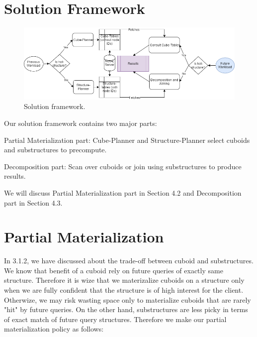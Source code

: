 




\section{Solution Framework}

\begin {figure}[H]
\centering
\includegraphics[scale=0.6]{pic/41.png}
\caption{Solution framework.}
\end{figure}

Our solution framework contains two major parts:

Partial Materialization part: Cube-Planner and Structure-Planner select cuboids and substructures to precompute.

Decomposition part: Scan over cuboids or join using substructures to produce results. 

We will discuss Partial Materialization part in Section 4.2 and Decomposition part in Section 4.3.

\section{Partial Materialization}


In 3.1.2, we have discussed about the trade-off between cuboid and substructures. We know that benefit of a cuboid rely on future queries of exactly same structure. Therefore it is wize that we materizalize cuboids on a structure only when we are fully confident that the structure is of high interest for the client. Otherwize, we may risk wasting space only to materialize cuboids that are rarely "hit" by future queries. On the other hand, substructures are less picky in terms of exact match of future query structures. Therefore we make our partial materialization policy as follows: 


